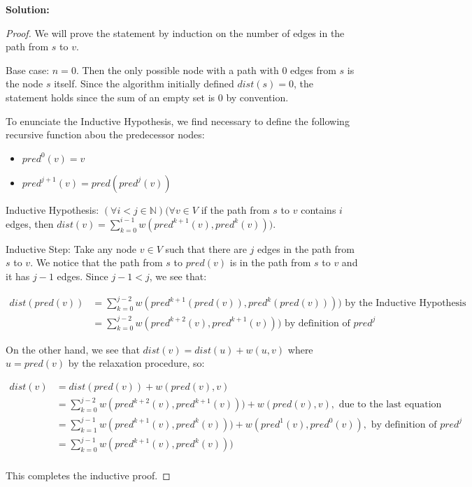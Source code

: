 \documentclass[a4paper, 11pt]{article}
\newcommand{\solution}{\textbf{Solution:}}
\begin{document}
\solution

\begin{proof}
	We will prove the statement by induction on the number of edges in the path from $s$ to $v$.

	Base case: $n = 0$. Then the only possible node with a path with $0$ edges from $s$ is the node $s$ itself. Since the algorithm initially defined $dist(s) = 0$, the statement holds since the sum of an empty set is $0$ by convention.

	To enunciate the Inductive Hypothesis, we find necessary to define the following recursive function abou the predecessor nodes:

	\begin{itemize}
		\item[] $pred^0(v) = v$
		\item[] $pred^{j + 1}(v) = pred(pred^{j}(v))$
	\end{itemize}

	Inductive Hypothesis: $(\forall i < j \in \mathbb{N})(\forall v \in V$ if the path from $s$ to $v$ contains $i$ edges, then $dist(v) = \sum_{k = 0}^{i-1} w(pred^{k + 1}(v), pred^{k}(v)))$. 

	Inductive Step: Take any node $v \in V$ such that there are $j$ edges in the path from $s$ to $v$. We notice that the path from $s$ to $pred(v)$ is in the path from $s$ to $v$ and it has $j - 1$ edges. Since $j - 1 < j$, we see that: 

	\begin{equation*}
		\begin{split}
			dist(pred(v)) &= \sum_{k = 0}^{j-2} w(pred^{k + 1}(pred(v)), pred^{k}(pred(v)))) \text { by the Inductive Hypothesis} \\
			&= \sum_{k = 0}^{j-2} w(pred^{k + 2}(v), pred^{k+1}(v))) \text{ by definition of $pred^j$}
		\end{split}
	\end{equation*}

On the other hand, we see that $dist(v) = dist(u) + w(u, v)$ where $u = pred(v)$ by the relaxation procedure, so:

\begin{equation*}
	\begin{split}
		dist(v) &= dist(pred(v)) + w(pred(v), v) \\
		&= \sum_{k = 0}^{j-2} w(pred^{k + 2}(v), pred^{k+1}(v))) + w(pred(v), v), \text{ due to the last equation} \\
		&= \sum_{k = 1}^{j-1} w(pred^{k + 1}(v), pred^{k}(v))) + w(pred^1(v), pred^0(v)), \text{ by definition of $pred^j$} \\
		&= \sum_{k = 0}^{j-1} w(pred^{k + 1}(v), pred^{k}(v))) \\
	\end{split}
\end{equation*}

This completes the inductive proof.

\end{proof}
\end{document}
